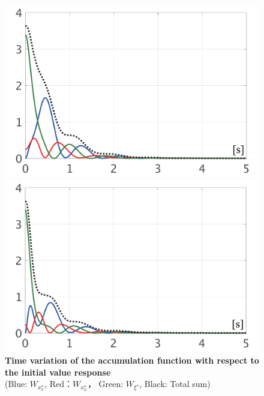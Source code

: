 \documentclass[tombow,dvipdfmx]{corona-a5-1.1}
\begin{document}
\begin{figure}[t]
  \centering
  {
  \begin{minipage}{0.49\linewidth}
    \centering
    \includegraphics[width = 1.0\linewidth]{figs/Wnlin1}
  \end{minipage}
  \begin{minipage}{0.49\linewidth}
    \centering
    \includegraphics[width = 1.0\linewidth]{figs/Wnlin2}
  \end{minipage}
  }
  \medskip
  \caption{\textbf{Time variation of the accumulation function with respect to the initial value response}
  \\  \centering(Blue: $W_{x^{\star}_{\mathds{F}}}$, Red：$W_{x^{\star}_{\mathds{G}}}$，
  Green: $W_{\xi^{\star}}$, Black: Total sum)}
  \label{fig:LyapWnlin}
\medskip
\end{figure}
\end{document}
